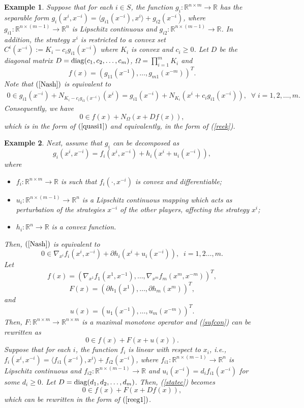 \documentclass[11pt]{article}
\def\beq{\begin{equation}}
\def\eeq{\end{equation}}
\def\baqn{\begin{eqnarray*}}
\def\eaqn{\end{eqnarray*}}
\theoremstyle{plain}
\newtheorem{example}{Example}
\newcommand{\R}{{\mathbb R}}
\begin{document}
{\begin{example}
Suppose that for each $i\in S$, the function $g_i: \R^{n\times m}\to \R$  has the separable  form $g_i(x^i,x^{-i})=\langle g_{i1}(x^{-i}), x^i \rangle+g_{i2}(x^{-i})$, where $g_{i1}: \R^{n\times (m-1)}\to \R^n$  is  Lipschitz continuous and  $g_{i2}: \R^{n\times (m-1)}\to \R$. In addition,  the strategy $x^i$ is restricted to a convex set $C^i(x^{-i}):=K_i-c_i  g_{i1}(x^{-i})$ where $K_i$ is convex and $c_i\ge0$.  Let $D$ be the diagonal matrix $D={\rm diag}(c_1,c_2,\ldots,c_m)$, 
$
\Omega=\prod_{i=1}^{m}K_i
$
and
$$
f(x)=(  g_{11}(x^{-1}),\ldots,   g_{m1}(x^{-m}))^T.
$$
Note that $(\ref{Nash})$ is equivalent to 
\baqn
0\in  g_{i1}(x^{-i})+N_{K_i-c_i  g_{i1}(x^{-i})}(x^i)= g_{i1}(x^{-i})+N_{K_i}(x^i+c_i  g_{i1}(x^{-i})),\;\;\forall \;i=1, 2, \ldots,m.
\eaqn
Consequently, we have 
\beq
0\in f(x)+N_\Omega(x+Df(x)),
\eeq
which is in the form of $(\ref{quasi1})$ and equivalently, in the form of (\ref{reek}).
\end{example}
\begin{example}
Next, assume that $g_i$ can be decomposed as 
\beq\label{decompo}
g_i(x^i,x^{-i})=f_i(x^i,x^{-i})+h_i(x^i+u_i(x^{-i})),
\eeq
where 
\begin{itemize}
\item ${f_i: \R^{n\times m}}\to {\R}$ {is such that}  $f_i(\cdot,x^{-i})$ is convex and differentiable;\\
\item $u_i: \R^{n\times (m-1)}\to {\R^n}$ is a Lipschitz continuous {mapping} which acts as perturbation  of the strategies $x^{-i}$ of the other players,  affecting the strategy $x^i$;\\
\item $h_i: \R^{n}\to {\R}$ is a convex function.
\end{itemize}
Then, $(\ref{Nash})$ is equivalent to 
\beq\label{sufcon}
0\in \nabla_{x^i} f_i(x^i,x^{-i})+\partial h_i(x^i+u_i(x^{-i})),\;\; i= 1,2\ldots,m.
\eeq
Let 
$$
f(x)=( \nabla_{x^1} f_1(x^1,x^{-1}),\ldots,  \nabla_{x^m} f_m(x^m,x^{-m}))^T,
$$
$$
F(x)=(\partial h_1(x^1),\ldots, \partial h_m(x^m))^T,
$$
and 
$$
u(x)=(u_1(x^{-1}), \ldots, u_m(x^{-m}))^T.
$$
Then, $F: \R^{n\times m}\to \R^{n\times m}$ is a maximal monotone operator and  (\ref{sufcon}) can be rewritten as 
\beq\label{statec}
0\in f(x)+F(x+u(x)).
\eeq
Suppose that for each $i$, the function $f_i$ is linear with respect to $x_i$, i.e., $f_i(x^i,x^{-i})=\langle f_{i1}(x^{-i}), x^i \rangle+f_{i2}(x^{-i})$,  where $f_{i1}: \R^{n\times (m-1)}\to \R^n$  is  Lipschitz continuous and  $f_{i2}: \R^{n\times (m-1)}\to \R$ and $u_i(x^{-i})=d_i f_{i1}(x^{-i})$ for some $d_i\ge0$.  Let  $D={\rm diag}(d_1,d_2,\ldots,d_m)$. Then, (\ref{statec}) becomes
\beq\label{stat}
0\in f(x)+F(x+Df(x)),
\eeq
which can be rewritten in the form of $(\ref{reeg1})$.
\end{example}

}
\end{document}
